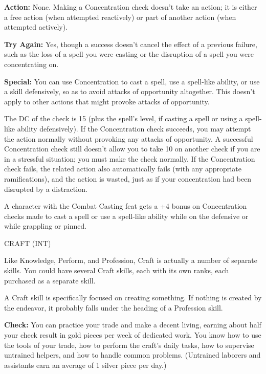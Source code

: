 \documentclass{article}
\begin{document}
\vspace{12pt}
\textbf{Action:} None. Making a Concentration check doesn't take an action; it 
is either a free action (when attempted reactively) or part of another action (when 
attempted actively).

\textbf{Try Again:} Yes, though a success doesn't cancel the effect of a previous 
failure, such as the loss of a spell you were casting or the disruption of a spell 
you were concentrating on.

\textbf{Special:} You can use Concentration to cast a spell, use a spell-like ability, 
or use a skill defensively, so as to avoid attacks of opportunity altogether. This 
doesn't apply to other actions that might provoke attacks of opportunity.

The DC of the check is 15 (plus the spell's level, if casting a spell or using 
a spell-like ability defensively). If the Concentration check succeeds, you may 
attempt the action normally without provoking any attacks of opportunity. A successful 
Concentration check still doesn't allow you to take 10 on another check if you 
are in a stressful situation; you must make the check normally. If the Concentration 
check fails, the related action also automatically fails (with any appropriate 
ramifications), and the action is wasted, just as if your concentration had been 
disrupted by a distraction. 

A character with the Combat Casting feat gets a +4 bonus on Concentration checks 
made to cast a spell or use a spell-like ability while on the defensive or while 
grappling or pinned.

\vspace{12pt}
CRAFT (INT)

Like Knowledge, Perform, and Profession, Craft is actually a number of separate 
skills. You could have several Craft skills, each with its own ranks, each purchased 
as a separate skill.

A Craft skill is specifically focused on creating something. If nothing is created 
by the endeavor, it probably falls under the heading of a Profession skill.

\textbf{Check:} You can practice your trade and make a decent living, earning about 
half your check result in gold pieces per week of dedicated work. You know how 
to use the tools of your trade, how to perform the craft's daily tasks, how to 
supervise untrained helpers, and how to handle common problems. (Untrained laborers 
and assistants earn an average of 1 silver piece per day.)
\end{document}
